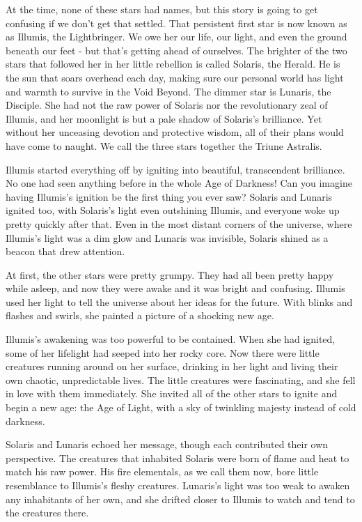     At the time, none of these stars had names, but this story is going to get confusing if we don't get that settled.
    That persistent first star is now known as as Illumis, the Lightbringer.
    We owe her our life, our light, and even the ground beneath our feet - but that's getting ahead of ourselves.
    The brighter of the two stars that followed her in her little rebellion is called Solaris, the Herald.
    He is the sun that soars overhead each day, making sure our personal world has light and warmth to survive in the Void Beyond.
    The dimmer star is Lunaris, the Disciple.
    She had not the raw power of Solaris nor the revolutionary zeal of Illumis, and her moonlight is but a pale shadow of Solaris's brilliance.
    Yet without her unceasing devotion and protective wisdom, all of their plans would have come to naught.
    We call the three stars together the Triune Astralis.

    Illumis started everything off by igniting into beautiful, transcendent brilliance.
    No one had seen anything before in the whole Age of Darkness!
    Can you imagine having Illumis's ignition be the first thing you ever saw?
    Solaris and Lunaris ignited too, with Solaris's light even outshining Illumis, and everyone woke up pretty quickly after that.
    Even in the most distant corners of the universe, where Illumis's light was a dim glow and Lunaris was invisible, Solaris shined as a beacon that drew attention.

    At first, the other stars were pretty grumpy.
    They had all been pretty happy while asleep, and now they were awake and it was bright and confusing.
    Illumis used her light to tell the universe about her ideas for the future.
    With blinks and flashes and swirls, she painted a picture of a shocking new age.

    Illumis's awakening was too powerful to be contained.
    When she had ignited, some of her lifelight had seeped into her rocky core.
    Now there were little creatures running around on her surface, drinking in her light and living their own chaotic, unpredictable lives.
    The little creatures were fascinating, and she fell in love with them immediately.
    She invited all of the other stars to ignite and begin a new age: the Age of Light, with a sky of twinkling majesty instead of cold darkness.

    Solaris and Lunaris echoed her message, though each contributed their own perspective.
    The creatures that inhabited Solaris were born of flame and heat to match his raw power.
    His fire elementals, as we call them now, bore little resemblance to Illumis's fleshy creatures.
    Lunaris's light was too weak to awaken any inhabitants of her own, and she drifted closer to Illumis to watch and tend to the creatures there.

